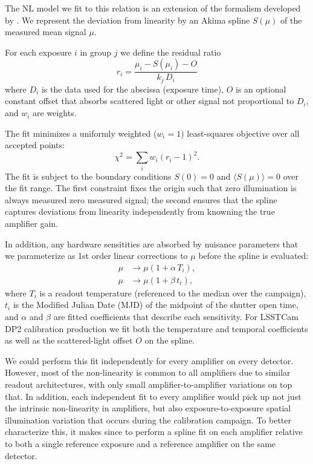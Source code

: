 The NL model we fit to this relation is an extension of the formalism developed by \citet{2019A&A...629A..36A}.
We represent the deviation from linearity by an Akima spline $S(\mu)$ of the measured mean signal $\mu$.

For each exposure $i$ in group $j$ we define the residual ratio
\begin{equation}
    r_i = \frac{\mu_i - S(\mu_i) - O}{k_j\, D_{i}}
    \label{eq:spline-nl-fit}
\end{equation}
where $D_{i}$ is the data used for the abscissa (exposure time), $O$ is an optional constant offset that absorbs scattered light or other signal not proportional to $D_{i}$, and $w_i$ are weights.

The fit minimizes a uniformly weighted ($w_i = 1$) least-squares objective over all accepted points:
\begin{equation}
    \chi^2 = \sum_{i} w_i \left(r_i - 1\right)^2. \label{eq:linearity-chisq}
\end{equation}
The fit is subject to the boundary conditions $S(0) = 0$ and $\langle S(\mu)\rangle = 0$ over the fit range.
The first constraint fixes the origin such that zero illumination is always measured zero measured signal; the second ensures that the spline captures deviations from linearity independently from knowning the true amplifier gain.

In addition, any hardware sensitities are absorbed by nuisance parameters that we parameterize as 1st order linear corrections to $\mu$ before the spline is evaluated:
\begin{align}
    \mu &\rightarrow \mu \left(1 + \alpha\, T_i\right), \label{eq:linearity-temp} \\
    \mu &\rightarrow \mu \left(1 + \beta\, t_i\right), \label{eq:linearity-time}
\end{align}
where $T_i$ is a readout temperature (referenced to the median over the campaign), $t_i$ is the Modified Julian Date (MJD) of the midpoint of the shutter open time, and $\alpha$ and $\beta$ are fitted coefficients that describe each sensitivity.
For LSSTCam DP2 calibration production we fit both the temperature and temporal coefficients as well as the scattered-light offset $O$ on the spline.

We could perform this fit independently for every amplifier on every detector. However, most of the non-linearity is common to all amplifiers due to similar readout architectures, with only small amplifier-to-amplifier variations on top that.
In addition, each independent fit to every amplifier would pick up not just the intrinsic non-linearity in amplifiers, but also exposure-to-exposure spatial illumination variation that occurs during the calibration campaign.
To better characterize this, it makes since to perform a spline fit on each amplifier relative to both a single reference exposure and a reference amplifier on the same detector.


